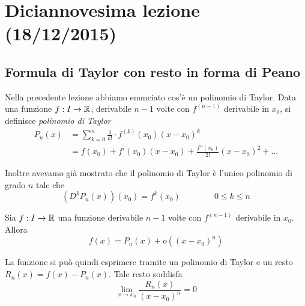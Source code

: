 \chapter{Diciannovesima lezione (18/12/2015)}

\section{Formula di Taylor con resto in forma di Peano}

Nella precedente lezione abbiamo enunciato cos'è un polinomio di Taylor. Data una funzione $f: I \to \mathbb R$, derivabile $n-1$ volte con $f^{(n-1)}$ derivabile in $x_0$, si definisce \emph{polinomio di Taylor}
\begin{align*}
P_n(x) &= \sum_{k = 0}^n \frac{1}{k!} \cdot f^{(k)} (x_0) (x-x_0)^k \\
&= f(x_0) + f'(x_0)(x-x_0) + \frac{f''(x_0)}{2!}(x-x_0)^2 + \ldots
\end{align*}

Inoltre avevamo già mostrato che il polinomio di Taylor è l'unico polinomio di grado $n$ tale che
\begin{equation*}
(D^k P_n(x)) (x_0) = f^k(x_0) \qquad \qquad 0 \le k \le n
\end{equation*}

\begin{theorem}
Sia $f: I \to \mathbb R$ una funzione derivabile $n-1$ volte con $f^{(n-1)}$ derivabile in $x_0$. Allora
\begin{equation*}
f(x) = P_n(x) + o((x-x_0)^n)
\end{equation*}
\end{theorem}
La funzione si può quindi esprimere tramite un polinomio di Taylor e un resto $R_n(x) = f(x) - P_n(x)$. Tale resto soddisfa
\begin{equation*}
\lim_{x \to x_0} \frac{R_n(x)}{(x-x_0)^n} = 0
\end{equation*}

